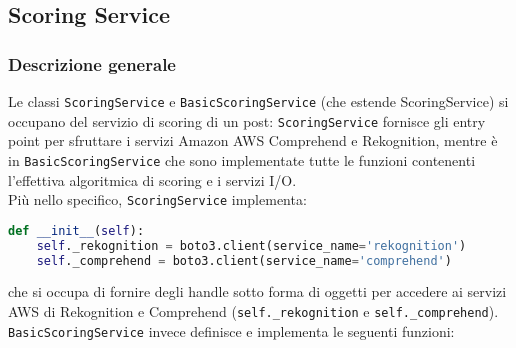 \subsection{Scoring Service}
\subsubsection{Descrizione generale}
Le classi \verb+ScoringService+ e \verb+BasicScoringService+ (che estende ScoringService\verb++) si occupano
del servizio di scoring di un post: \verb+ScoringService+ fornisce gli entry point per sfruttare 
i servizi Amazon AWS Comprehend e Rekognition, mentre è in \verb+BasicScoringService+ che sono 
implementate tutte le funzioni contenenti l'effettiva algoritmica di scoring e i servizi I/O.\\
Più nello specifico, \verb+ScoringService+ implementa:
\begin{lstlisting}[language=Python]
def __init__(self):
    self._rekognition = boto3.client(service_name='rekognition')
    self._comprehend = boto3.client(service_name='comprehend')
\end{lstlisting}
che si occupa di fornire degli handle sotto forma di oggetti per accedere ai servizi AWS di Rekognition
e Comprehend (\verb+self._rekognition+ e \verb+self._comprehend+).\\
\verb+BasicScoringService+ invece definisce e implementa le seguenti funzioni:
